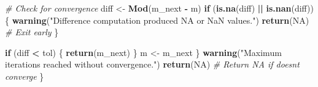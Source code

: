 \documentclass[
]{article}
\newenvironment{Shaded}{\begin{snugshade}}{\end{snugshade}}
\newcommand{\CommentTok}[1]{\textcolor[rgb]{0.56,0.35,0.01}{\textit{#1}}}
\newcommand{\ConstantTok}[1]{\textcolor[rgb]{0.56,0.35,0.01}{#1}}
\newcommand{\ControlFlowTok}[1]{\textcolor[rgb]{0.13,0.29,0.53}{\textbf{#1}}}
\newcommand{\FunctionTok}[1]{\textcolor[rgb]{0.13,0.29,0.53}{\textbf{#1}}}
\newcommand{\NormalTok}[1]{#1}
\newcommand{\OtherTok}[1]{\textcolor[rgb]{0.56,0.35,0.01}{#1}}
\newcommand{\SpecialCharTok}[1]{\textcolor[rgb]{0.81,0.36,0.00}{\textbf{#1}}}
\newcommand{\StringTok}[1]{\textcolor[rgb]{0.31,0.60,0.02}{#1}}
\begin{document}
\begin{Shaded}
\begin{Highlighting}[]
    \CommentTok{\# Check for convergence}
\NormalTok{    diff }\OtherTok{\textless{}{-}} \FunctionTok{Mod}\NormalTok{(m\_next }\SpecialCharTok{{-}}\NormalTok{ m)}
    \ControlFlowTok{if}\NormalTok{ (}\FunctionTok{is.na}\NormalTok{(diff) }\SpecialCharTok{||} \FunctionTok{is.nan}\NormalTok{(diff)) \{}
      \FunctionTok{warning}\NormalTok{(}\StringTok{"Difference computation produced NA or NaN values."}\NormalTok{)}
      \FunctionTok{return}\NormalTok{(}\ConstantTok{NA}\NormalTok{)  }\CommentTok{\# Exit early}
\NormalTok{    \}}
    
    \ControlFlowTok{if}\NormalTok{ (diff }\SpecialCharTok{\textless{}}\NormalTok{ tol) \{}
      \FunctionTok{return}\NormalTok{(m\_next)}
\NormalTok{    \}}
\NormalTok{    m }\OtherTok{\textless{}{-}}\NormalTok{ m\_next}
\NormalTok{  \}}
  \FunctionTok{warning}\NormalTok{(}\StringTok{"Maximum iterations reached without convergence."}\NormalTok{)}
  \FunctionTok{return}\NormalTok{(}\ConstantTok{NA}\NormalTok{)  }\CommentTok{\# Return NA if doesn\textquotesingle{}t converge}
\NormalTok{\}}
\end{Highlighting}
\end{Shaded}
\end{document}
